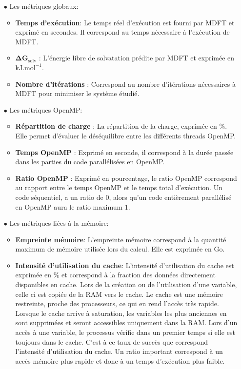 \begin{itemize}
\item[$\bullet$] Les métriques globaux:
  \begin{itemize}
    \item \textbf{Temps d’exécution}: Le temps réel d'exécution est fourni par MDFT et exprimé en secondes. Il correspond au temps nécessaire à l'exécution de MDFT.
    \item $\mathbf{\Delta G_{\mathrm{solv}}}$ : L’énergie libre de solvatation prédite par MDFT et exprimée en $\mathrm{kJ.mol}^{-1}$.
    \item \textbf{Nombre d'itérations} : Correspond au nombre d'itérations nécessaires à MDFT pour minimiser le système étudié.
  \end{itemize}
  \vspace*{1.5ex}%

\item[$\bullet$] Les métriques OpenMP:
  \begin{itemize}
  \item \textbf{Répartition de charge} : La répartition de la charge, exprimée en \%. Elle permet d'évaluer le déséquilibre entre les différents threads OpenMP.
  \item \textbf{Temps OpenMP} : Exprimé en seconde, il correspond à la durée passée dans les parties du code parallélisées en OpenMP.
  \item \textbf{Ratio OpenMP} : Exprimé en pourcentage, le ratio OpenMP correspond au rapport entre le temps OpenMP et le temps total d'exécution. Un code séquentiel, a un ratio de 0, alors qu'un code entièrement parallélisé en OpenMP aura le ratio maximum 1. 
  \end{itemize}
  \vspace*{1.5ex}%

\item[$\bullet$] Les métriques liées à la mémoire:
  \begin{itemize}
  \item \textbf{Empreinte mémoire}: L'empreinte mémoire correspond à la quantité maximum de mémoire utilisée lors du calcul. Elle est exprimée en Go.
  \item \textbf{Intensité d'utilisation du cache}: L'intensité d'utilisation du cache est exprimée en \% et correspond à la fraction des données directement disponibles en cache. Lors de la création ou de l'utilisation d'une variable, celle ci est copiée de la RAM vers le cache. Le cache est une mémoire restreinte, proche des processeurs, ce qui en rend l'accès très rapide. Lorsque le cache arrive à saturation, les variables les plus anciennes en sont supprimées et seront accessibles uniquement dans la RAM. Lors d'un accès à une variable, le processus vérifie dans un premier temps si elle est toujours dans le cache. C'est à ce taux de succès que correspond l'intensité d'utilisation du cache. Un ratio important correspond à un accès mémoire plus rapide et donc à un temps d'exécution plus faible.
  \end{itemize}
  \vspace*{1.5ex}%


\end{itemize}
